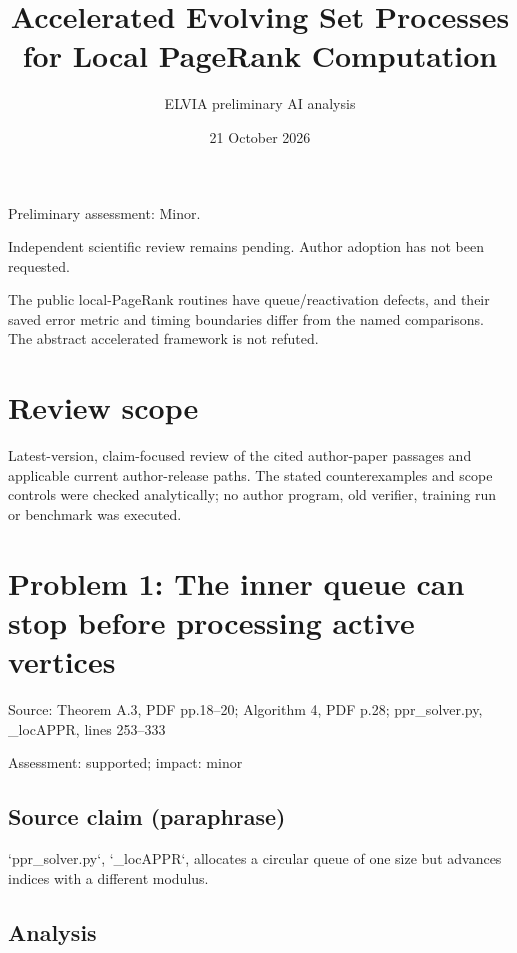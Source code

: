 \documentclass[11pt]{article}
\begin{document}
\title{Accelerated Evolving Set Processes for Local PageRank Computation}

\author{ELVIA preliminary AI analysis}\date{21 October 2026}\maketitle

Preliminary assessment: Minor.\par

Independent scientific review remains pending. Author adoption has not been requested.

The public local-PageRank routines have queue/reactivation defects, and their saved error metric and timing boundaries differ from the named comparisons. The abstract accelerated framework is not refuted.

\section*{Review scope}

Latest-version, claim-focused review of the cited author-paper passages and applicable current author-release paths. The stated counterexamples and scope controls were checked analytically; no author program, old verifier, training run or benchmark was executed.

\section*{Problem 1: The inner queue can stop before processing active vertices}

Source: Theorem A.3, PDF pp.18–20; Algorithm 4, PDF p.28; ppr\_solver.py, \_locAPPR, lines 253–333

Assessment: supported; impact: minor

\subsection*{Source claim (paraphrase)}

`ppr\_solver.py`, `\_locAPPR`, allocates a circular queue of one size but advances indices with a different modulus.

\subsection*{Analysis}
\end{document}
